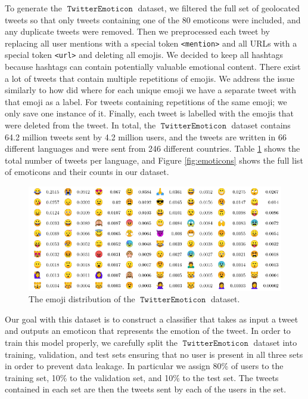 \documentclass[11pt]{article}
\DeclareMathOperator{\emoticon}{\texttt{TwitterEmoticon}}
\begin{document}
To generate the $\emoticon$ dataset, 
we filtered the full set of geolocated tweets so that only tweets containing one of the 80 emoticons were included,
and any duplicate tweets were removed.
Then we preprocessed each tweet by replacing all user mentions with a special token \texttt{<mention>} and all URLs with a special token \texttt{<url>} and deleting all emojis.
We decided to keep all hashtags because hashtags can contain potentially valuable emotional content.
There exist a lot of tweets that contain multiple repetitions of emojis.
We address the issue similarly to how \cite{100_million_tweets} did where for each unique emoji we have a separate tweet with that emoji as a label. 
For tweets containing repetitions of the same emoji; we only save one instance of it.
Finally, each tweet is labelled with the emojis that were deleted from the tweet.
In total, the $\emoticon$ dataset contains 64.2 million tweets sent by 4.2 million users,
and the tweets are written in 66 different languages and were sent from 246 different countries.
Table \ref{table:lang} shows the total number of tweets per language,
and Figure \ref{fig:emoticons} shows the full list of emoticons and their counts in our dataset. 

\begin{figure}
    \centering
    \includegraphics[scale = 1.2]{images/emojitable.pdf}
    \caption{The emoji distribution of the $\emoticon$ dataset.} 
    \label{table:lang}
\end{figure}

Our goal with this dataset is to construct a classifier that takes as input a tweet and outputs an emoticon that represents the emotion of the tweet.
In order to train this model properly,
we carefully split the $\emoticon$ dataset into training, validation, and test sets ensuring that no user is present in all three sets in order to prevent data leakage.
In particular we assign 80\% of users to the training set, 10\% to the validation set, and 10\% to the test set.
The tweets contained in each set are then the tweets sent by each of the users in the set.
\end{document}
